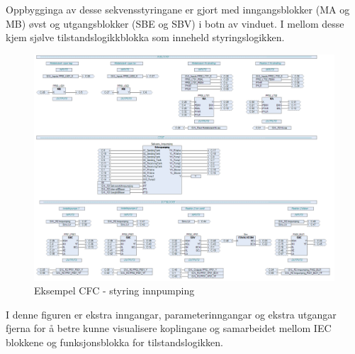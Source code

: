 Oppbygginga av desse sekvensstyringane er gjort med inngangsblokker (\gls{MA} og \gls{MB}) øvst og utgangsblokker (\gls{SBE} og \gls{SBV}) i botn av vinduet.
I mellom desse kjem sjølve tilstandslogikkblokka som inneheld styringslogikken.

\begin{figure}[htbp]
    \centering
    \includegraphics[width=1\textwidth]{Bilder/Heile_innpump.png}
    \caption{Eksempel \gls{CFC} - styring innpumping}\label{fig:CFCInnpumping}
\end{figure}

I denne figuren er ekstra inngangar, parameterinngangar og ekstra utgangar fjerna for å betre kunne visualisere koplingane og samarbeidet mellom
\gls{IEC} blokkene og funksjonsblokka for tilstandslogikken.

\newpage

